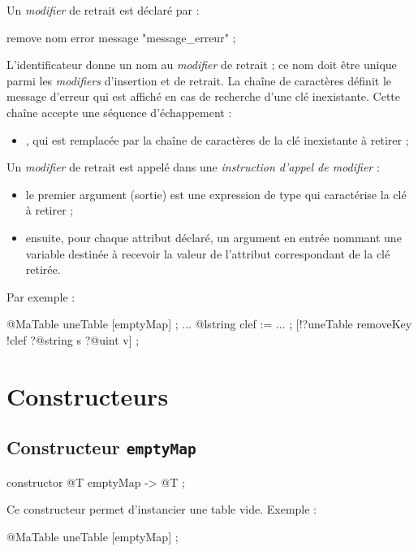 Un \emph{modifier} de retrait est déclaré par :

\begin{galgascode}
remove nom error message "message_erreur" ;
\end{galgascode}

L'identificateur  donne un nom au \emph{modifier} de retrait ; ce nom doit être unique parmi les \emph{modifiers} d'insertion et de retrait. La chaîne de caractères  définit le message d'erreur qui est affiché en cas de recherche d'une clé inexistante. Cette chaîne accepte une séquence d'échappement :
\begin{itemize}
  \item {}, qui est remplacée par la chaîne de caractères de la clé inexistante à retirer ;
\end{itemize}


Un \emph{modifier} de retrait est appelé dans une \emph{instruction d'appel de modifier} :
\begin{itemize}
  \item le premier argument (sortie) est une expression de type  qui caractérise la clé à retirer ;
  \item ensuite, pour chaque attribut déclaré, un argument en entrée nommant une variable destinée à recevoir la valeur de l'attribut correspondant de la clé retirée.
\end{itemize}

Par exemple :
\begin{galgascode}
@MaTable uneTable [emptyMap] ;
...
@lstring clef := ... ;
[!?uneTable removeKey !clef ?@string s ?@uint v] ;
\end{galgascode}






\section{Constructeurs}

\subsection{Constructeur \texttt{emptyMap}}

\begin{galgascode}
constructor @T emptyMap -> @T ;
\end{galgascode}

Ce constructeur permet d'instancier une table vide. Exemple :
\begin{galgascode}
@MaTable uneTable [emptyMap] ;
\end{galgascode}

